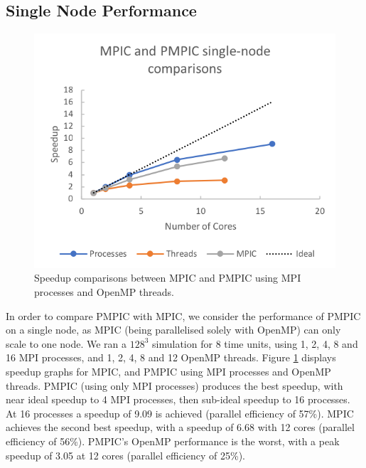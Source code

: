 \documentclass{article}
\begin{document}
\subsection{Single Node Performance}

\begin{figure}
  \begin{center}
    \includegraphics{pmpic_images/singleNode.png}
  \end{center}
  \caption{Speedup comparisons between MPIC and PMPIC using MPI processes and OpenMP threads.}
  \label{MPI-OMP-comp}
\end{figure}
In order to compare PMPIC with MPIC, we consider the performance of PMPIC on a single node, as MPIC (being parallelised solely with OpenMP) can only scale to one node. We ran a $128^3$ simulation for 8 time units, using 1, 2, 4, 8 and 16 MPI processes, and 1, 2, 4, 8 and 12 OpenMP threads. Figure \ref{MPI-OMP-comp} displays speedup graphs for MPIC, and PMPIC using MPI processes and OpenMP threads. PMPIC (using only MPI processes) produces the best speedup, with near ideal speedup to 4 MPI processes, then sub-ideal speedup to 16 processes. At 16 processes a speedup of 9.09 is achieved (parallel efficiency of 57\%). MPIC achieves the second best speedup, with a speedup of 6.68 with 12 cores (parallel efficiency of 56\%). PMPIC's OpenMP performance is the worst, with a peak speedup of 3.05 at 12 cores (parallel efficiency of 25\%).
\end{document}
